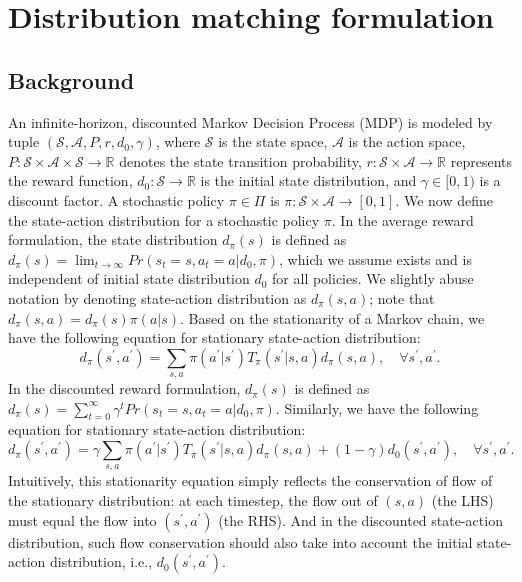 \section{Distribution matching formulation}

\subsection{Background}
An infinite-horizon, discounted Markov Decision Process (MDP) is modeled by tuple $(\mathcal{S} , \mathcal{A}, P, r , d_0, \gamma)$, where $\mathcal{S}$ is the state space, $\mathcal{A}$ is the action space, $P:\mathcal{S}\times\mathcal{A}\times\mathcal{S}\rightarrow \mathbb{R}$ denotes the state transition probability, $r:\mathcal{S}\times\mathcal{A}\rightarrow\mathbb{R}$ represents the reward function, $d_0:\mathcal{S} \rightarrow\mathbb{R}$ is the initial state distribution, and $\gamma\in[0, 1)$ is a discount factor.
A stochastic policy $\pi\in\Pi$ is $\pi: \mathcal{S}\times\mathcal{A}\rightarrow [0, 1]$.
We now define the state-action distribution for a stochastic policy $\pi$. 
In the average reward formulation, the state distribution $d_\pi(s)$ is defined as $d_{\pi}(s) =\lim_{t\rightarrow\infty}Pr(s_t=s, a_t=a|d_0, \pi)$, which we assume exists and is independent of initial state distribution $d_0$ for all policies. 
We slightly abuse notation by denoting state-action distribution as $d_{\pi}(s, a)$; note that $d_{\pi}(s, a) = d_{\pi}(s)\pi(a|s)$. 
Based on the stationarity of a Markov chain, we have the following equation for stationary state-action distribution:
\begin{equation*}\label{equ:average_reward}
d_{\pi}(s^\prime, a^\prime) = \sum_{s, a} \pi(a^\prime|s^\prime) T_{\pi}(s^\prime|s, a) d_{\pi}(s, a), \quad \forall s^\prime, a^\prime.
\end{equation*}
In the discounted reward formulation, $d_\pi(s)$ is defined as $d_{\pi}(s)=\sum_{t=0}^{\infty}\gamma^t Pr(s_t=s, a_t=a|d_0, \pi)$. Similarly, we have the following equation for stationary state-action distribution: 
\begin{equation*}
d_{\pi}(s^\prime, a^\prime) = \gamma \sum_{s, a}\pi(a^\prime|s^\prime) T_{\pi}(s^\prime |s, a) d_{\pi}(s, a) + (1-\gamma)d_0(s^\prime, a^\prime), \quad \forall s^\prime, a^\prime. 
\end{equation*}
Intuitively, this stationarity equation simply reflects the conservation of flow of the stationary distribution: at each timestep, the flow out of $(s, a)$ (the LHS) must equal the flow into $(s^\prime, a^\prime)$ (the RHS). And in the discounted state-action distribution, such flow conservation should also take into account the initial state-action distribution, i.e., $d_0(s^\prime, a^\prime)$. 

